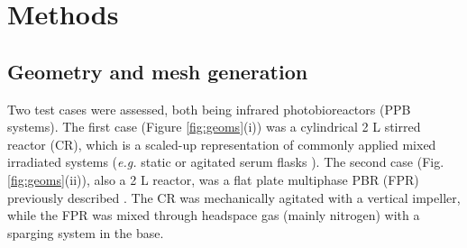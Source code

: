 



\section{Methods}
\label{sec:ch3_gov}
\subsection{Geometry and mesh generation}
\label{ssec:geom}
Two test cases were assessed, both being infrared photobioreactors (PPB systems). The first case (Figure \ref{fig:geoms}(i)) was a cylindrical 2 L stirred reactor (CR), which is a scaled-up representation of commonly applied mixed irradiated systems (\textit{e.g.} static or agitated serum flasks \cite{hulsen2014}). The second case (Fig. \ref{fig:geoms}(ii)), also a 2 L reactor, was a flat plate multiphase PBR (FPR) previously described \cite{hulsen2016, hulsen2016a}. The CR was mechanically agitated with a vertical impeller, while the FPR was mixed through headspace gas (mainly nitrogen) with a sparging system in the base.

